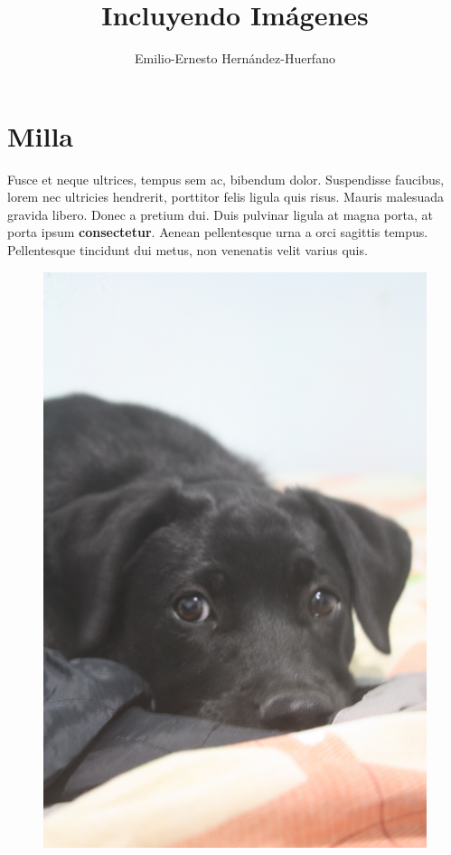 \documentclass[12pt,letterpaper,oneside]{book}
\title{Incluyendo Imágenes}
\author{Emilio-Ernesto Hernández-Huerfano}
\begin{document}
\maketitle
\tableofcontents
\listoffigures


\chapter{Milla}
\noindent Fusce et neque ultrices, tempus sem ac, bibendum dolor. Suspendisse faucibus, lorem nec ultricies hendrerit, porttitor felis ligula quis risus. Mauris malesuada gravida libero. Donec a pretium dui. Duis pulvinar ligula at magna porta, at porta ipsum \textbf{consectetur}. Aenean pellentesque urna a orci sagittis tempus. Pellentesque tincidunt dui metus, non venenatis velit varius quis.

\begin{figure}
\includegraphics[scale=.06]{img/milla.jpg}
\end{figure}
\end{document}
